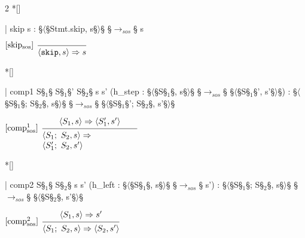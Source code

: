 \begin{paracol}{2}
\switchcolumn[1]*[]
\begin{leftcolumn}
    \begin{Lean_Code}
  | skip {s} :
    §\(\langle\)§Stmt.skip, s§\(\rangle\)§ §\(\to_{sos}\)§ s
    \end{Lean_Code}
\end{leftcolumn}
\begin{rightcolumn}
\vspace{1.1em}
    \(
\begin{prooftree}
  \hypo{} %
  \infer[left label=[skip$_{\text{sos}}$]]1{ \langle \mathtt{skip}, s \rangle \Rightarrow s}
\end{prooftree}
            \)
    \end{rightcolumn}
    \vspace{1em}
    \switchcolumn[1]*[]
    \begin{leftcolumn}
        \begin{Lean_Code}
  | comp1 {S§$_{1}$§ S§$_{1}$§' S§$_{2}$§ s s'}
    (h_step :
    §\(\langle\)§S§$_{1}$§, s§\(\rangle\)§ §\(\to_{sos}\)§ §\(\langle\)§S§$_{1}$§', s'§\(\rangle\)§) :
    §\(\langle\)§S§$_{1}$§; S§$_{2}$§, s§\(\rangle\)§ §\(\to_{sos}\)§
      §\(\langle\)§S§$_{1}$§'; S§$_{2}$§, s'§\(\rangle\)§
    \end{Lean_Code}
\end{leftcolumn}
\begin{rightcolumn}
\vspace{2.5em}
    \(
\begin{prooftree}
  \hypo{\langle S_1, s \rangle \Rightarrow \langle S_1', s' \rangle}
  \infer[
    left label=[comp$_{\text{sos}}^{1}$]
    ]1{
        \parbox{4cm}{$
    \langle S_1;\ S_2, s \rangle \Rightarrow \\
    \langle S_1';\ S_2, s' \rangle
        $}
    }
\end{prooftree}
    \)
\end{rightcolumn}

\switchcolumn[1]*[]
\begin{leftcolumn}
    \begin{Lean_Code}
  | comp2 {S§$_{1}$§ S§$_{2}$§ s s'}
    (h_left :
      §\(\langle\)§S§$_{1}$§, s§\(\rangle\)§ §\(\to_{sos}\)§ s') :
    §\(\langle\)§S§$_{1}$§; S§$_{2}$§, s§\(\rangle\)§ §\(\to_{sos}\)§ §\(\langle\)§S§$_{2}$§, s'§\(\rangle\)§
        \end{Lean_Code}
    \end{leftcolumn}
    \begin{rightcolumn}
        \vspace{2.5em}
            \(
\begin{prooftree}
  \hypo{\langle S_1, s \rangle \Rightarrow s'}
  \infer[
    left label=[comp$_{\text{sos}}^{2}$]
  ]1{
    \langle S_1;\ S_2, s \rangle \Rightarrow \langle S_2, s'\rangle}
\end{prooftree}
    \)
\end{rightcolumn}


\end{paracol}
